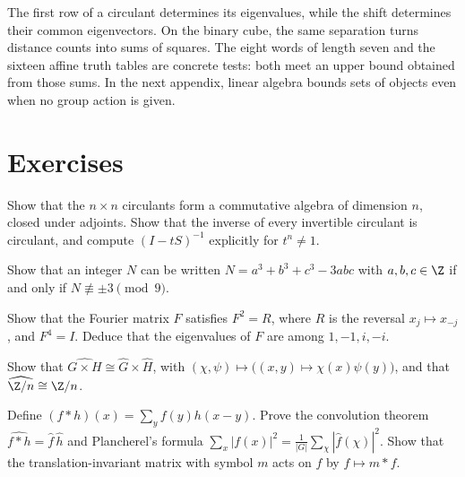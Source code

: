 \begin{beauty}
The first row of a circulant determines its eigenvalues, while the shift
determines their common eigenvectors. On the binary cube, the same separation
turns distance counts into sums of squares. The eight words of length seven
and the sixteen affine truth tables are concrete tests: both meet an upper
bound obtained from those sums. In the next appendix, linear algebra bounds
sets of objects even when no group action is given.
\end{beauty}

\section{Exercises}

\begin{exercise}[$\star$]\label{linear:ex:circalg}
Show that the $n\times n$ circulants form a commutative algebra of dimension
$n$, closed under adjoints. Show that the inverse of every invertible
circulant is circulant, and compute $(I-tS)^{-1}$ explicitly for $t^n\ne1$.
\end{exercise}

\begin{exercise}[$\star\star$]\label{linear:ex:circ3}
Show that an integer $N$ can be written $N=a^3+b^3+c^3-3abc$ with $a,b,c\in\Z$ if and only if $N\not\equiv\pm3\pmod9$.
\end{exercise}

\begin{exercise}[$\star$]\label{linear:ex:fourier}
Show that the Fourier matrix $F$ satisfies $F^2=R$, where $R$ is the reversal $x_j\mapsto x_{-j}$, and $F^4=I$. Deduce that the
eigenvalues of $F$ are among $1,-1,i,-i$.
\end{exercise}

\begin{exercise}[$\star$]\label{linear:ex:dualgroup}
Show that $\widehat{G\times H}\cong\widehat G\times\widehat H$, with $(\chi,\psi)\mapsto\bigl((x,y)\mapsto\chi(x)\psi(y)\bigr)$, and that
$\widehat{\Z/n}\cong\Z/n$.
\end{exercise}

\begin{exercise}[$\star\star$]\label{linear:ex:convolution}
Define $(f*h)(x)=\sum_yf(y)h(x-y)$. Prove the convolution theorem $\widehat{f*h}=\hat f\,\hat h$ and Plancherel's formula
$\sum_x|f(x)|^2=\frac1{|G|}\sum_\chi|\hat f(\chi)|^2$. Show that the translation-invariant matrix with symbol $m$ acts on $f$ by
$f\mapsto m*f$.
\end{exercise}

